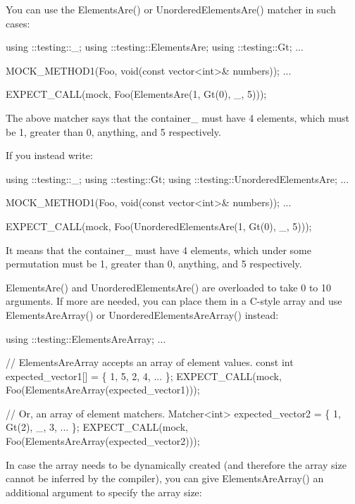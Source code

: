 You can use the {\ttfamily Elements\+Are()} or {\ttfamily Unordered\+Elements\+Are()} matcher in such cases\+:


\begin{DoxyCode}
using ::testing::\_;
using ::testing::ElementsAre;
using ::testing::Gt;
...

  MOCK\_METHOD1(Foo, \textcolor{keywordtype}{void}(\textcolor{keyword}{const} vector<int>& numbers));
...

  EXPECT\_CALL(mock, Foo(ElementsAre(1, Gt(0), \_, 5)));
\end{DoxyCode}


The above matcher says that the container_ must have 4 elements, which must be 1, greater than 0, anything, and 5 respectively.

If you instead write\+:


\begin{DoxyCode}
using ::testing::\_;
using ::testing::Gt;
using ::testing::UnorderedElementsAre;
...

  MOCK\_METHOD1(Foo, \textcolor{keywordtype}{void}(\textcolor{keyword}{const} vector<int>& numbers));
...

  EXPECT\_CALL(mock, Foo(UnorderedElementsAre(1, Gt(0), \_, 5)));
\end{DoxyCode}


It means that the container_ must have 4 elements, which under some permutation must be 1, greater than 0, anything, and 5 respectively.

{\ttfamily Elements\+Are()} and {\ttfamily Unordered\+Elements\+Are()} are overloaded to take 0 to 10 arguments. If more are needed, you can place them in a C-\/style array and use {\ttfamily Elements\+Are\+Array()} or {\ttfamily Unordered\+Elements\+Are\+Array()} instead\+:


\begin{DoxyCode}
using ::testing::ElementsAreArray;
...

  \textcolor{comment}{// ElementsAreArray accepts an array of element values.}
  \textcolor{keyword}{const} \textcolor{keywordtype}{int} expected\_vector1[] = \{ 1, 5, 2, 4, ... \};
  EXPECT\_CALL(mock, Foo(ElementsAreArray(expected\_vector1)));

  \textcolor{comment}{// Or, an array of element matchers.}
  Matcher<int> expected\_vector2 = \{ 1, Gt(2), \_, 3, ... \};
  EXPECT\_CALL(mock, Foo(ElementsAreArray(expected\_vector2)));
\end{DoxyCode}


In case the array needs to be dynamically created (and therefore the array size cannot be inferred by the compiler), you can give {\ttfamily Elements\+Are\+Array()} an additional argument to specify the array size\+:


